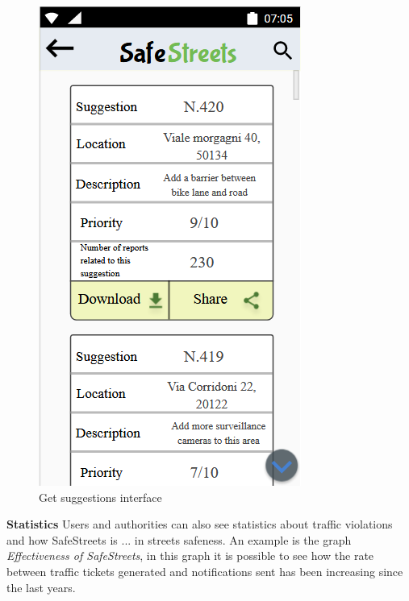        \begin{figure}[h]
        \centering
        \includegraphics[scale=1]{Images/suggestions.png}
        \caption{Get suggestions interface}
    \end{figure}\newpage
    \noindent\textbf{Statistics}
    Users and authorities can also see statistics about traffic violations and how SafeStreets is ... in streets safeness. An example is the graph \textit{Effectiveness of SafeStreets}, in this graph it is possible to see how the rate between traffic tickets generated and notifications sent has been increasing since the last years.  
